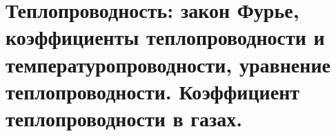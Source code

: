 \section{\normalsize Теплопроводность: закон Фурье, коэффициенты теплопроводности и температуропроводности,	уравнение теплопроводности. Коэффициент теплопроводности в газах.}